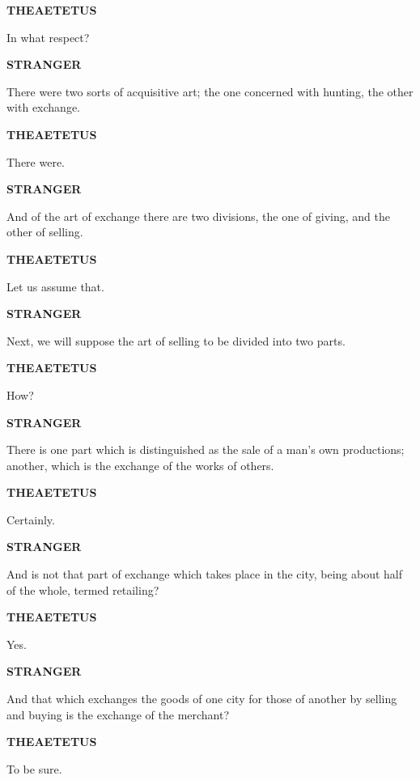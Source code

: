 \documentclass[11pt,letter]{article}
\begin{document}
\par \textbf{THEAETETUS}
\par   In what respect?

\par \textbf{STRANGER}
\par   There were two sorts of acquisitive art; the one concerned with hunting, the other with exchange.

\par \textbf{THEAETETUS}
\par   There were.

\par \textbf{STRANGER}
\par   And of the art of exchange there are two divisions, the one of giving, and the other of selling.

\par \textbf{THEAETETUS}
\par   Let us assume that.

\par \textbf{STRANGER}
\par   Next, we will suppose the art of selling to be divided into two parts.

\par \textbf{THEAETETUS}
\par   How?

\par \textbf{STRANGER}
\par   There is one part which is distinguished as the sale of a man's own productions; another, which is the exchange of the works of others.

\par \textbf{THEAETETUS}
\par   Certainly.

\par \textbf{STRANGER}
\par   And is not that part of exchange which takes place in the city, being about half of the whole, termed retailing?

\par \textbf{THEAETETUS}
\par   Yes.

\par \textbf{STRANGER}
\par   And that which exchanges the goods of one city for those of another by selling and buying is the exchange of the merchant?

\par \textbf{THEAETETUS}
\par   To be sure.
\end{document}
